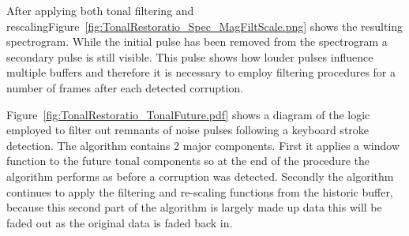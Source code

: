 After applying both tonal filtering and rescaling\DIFaddbegin \DIFadd{, }\DIFaddend Figure~\ref{fig:TonalRestoratio_Spec_MagFiltScale.png} shows the resulting spectrogram. While the initial pulse has been removed from the spectrogram a secondary pulse is still visible. This pulse shows how louder pulses influence multiple buffers and therefore it is necessary to employ filtering procedures for a number of frames after each detected corruption.

Figure~\ref{fig:TonalRestoratio_TonalFuture.pdf} shows a diagram of the logic employed to filter out remnants of noise pulses following a keyboard stroke detection. The algorithm contains 2 major components. First it applies a window function to the future tonal components so at the end of the procedure the algorithm performs as before a corruption was detected. Secondly the algorithm continues to apply the filtering and re-scaling functions from the historic buffer, because this second part of the algorithm is largely made up data this will be faded out as the original data is faded back in.

